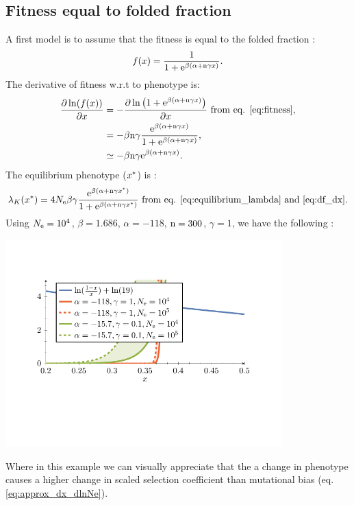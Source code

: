 \documentclass{article}
\begin{document}
\subsection{Fitness equal to folded fraction}
A first model is to assume that the fitness is equal to the folded fraction \cite{Goldstein2013}:
\begin{gather}
f(x) = \frac{1}{1 + \mathrm{e}^{\beta(\alpha + \text{n} \gamma x)}}. \label{eq:fitness}
\end{gather}
The derivative of fitness w.r.t to phenotype is:
\begin{align}
\frac{\partial \ln (f(x))}{\partial x}  & = - \frac{\partial \ln \left( 1 + \mathrm{e}^{\beta(\alpha + \text{n} \gamma x)} \right)}{\partial x} \text{ from eq. \ref{eq:fitness}}, \\
& = - \beta \text{n} \gamma \frac{\mathrm{e}^{\beta(\alpha + \text{n} \gamma x)}}{1 + \mathrm{e}^{\beta(\alpha + \text{n} \gamma x)}} \label{eq:df_dx},\\
& \simeq - \beta \text{n} \gamma \mathrm{e}^{\beta(\alpha + \text{n} \gamma x)}.
\end{align}
The equilibrium phenotype ($x^{*}$) is :
\begin{gather}
\lambda_{K}(x^{*}) = 4N_{\mathrm{e}} \beta \gamma \frac{\mathrm{e}^{\beta(\alpha + \text{n} \gamma x^{*})}}{1 + \mathrm{e}^{\beta(\alpha + \text{n} \gamma x^{*})}}  \text{ from eq. \ref{eq:equilibrium_lambda} and \ref{eq:df_dx}}.
\end{gather}
Using $N_{\mathrm{e}}=10^4$, $\beta=1.686$, $\alpha = -118$, $\text{n}=300$, $\gamma=1$, we have the following :
\begin{center}
\includegraphics[width=0.8\textwidth, page=4] {figures.pdf}
\end{center}
Where in this example we can visually appreciate that the a change in phenotype causes a higher change in scaled selection coefficient than mutational bias (eq. \ref{eq:approx_dx_dlnNe}).
\end{document}
